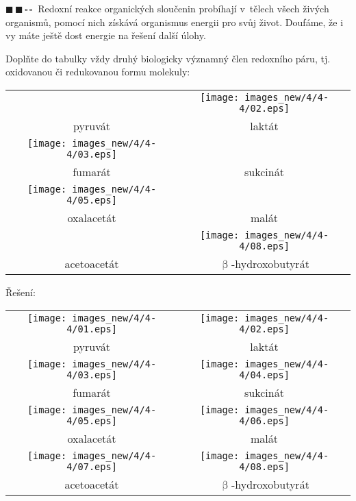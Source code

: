 \documentclass{book}
\newcommand{\dva}{$\blacksquare \, \blacksquare \, \square \, \square \; \; $}
\renewenvironment{quotation}{\par}{\par} %
\begin{document}
\hrulefill %
\begin{quotation}
\dva Redoxní reakce organických sloučenin probíhají v~tělech všech živých organismů, pomocí nich získává organismus energii pro svůj život. Doufáme, že i vy máte ještě dost energie na řešení další úlohy.

Doplňte do tabulky vždy druhý biologicky významný člen redoxního páru,
tj. oxidovanou či redukovanou formu molekuly:
\noindent \begin{center}
\begin{tabular}{c|c}

& \texttt{[image: images\_new/4/4-4/02.eps]}\tabularnewline
pyruvát & laktát\tabularnewline
\hline
\texttt{[image: images\_new/4/4-4/03.eps]} & \tabularnewline
fumarát & sukcinát\tabularnewline
\hline
\texttt{[image: images\_new/4/4-4/05.eps]} & \tabularnewline
oxalacetát & malát\tabularnewline
\hline
& \texttt{[image: images\_new/4/4-4/08.eps]}\tabularnewline
acetoacetát & $\upbeta$-hydroxobutyrát\tabularnewline

\end{tabular}
\end{center}
\end{quotation} \dotfill \par 

\newpage %
\-Řešení:
\noindent \begin{center}
\begin{tabular}{c|c}

\texttt{[image: images\_new/4/4-4/01.eps]} & \texttt{[image: images\_new/4/4-4/02.eps]}\tabularnewline
pyruvát & laktát\tabularnewline
\hline
\texttt{[image: images\_new/4/4-4/03.eps]} & \texttt{[image: images\_new/4/4-4/04.eps]}\tabularnewline
fumarát & sukcinát\tabularnewline
\hline
\texttt{[image: images\_new/4/4-4/05.eps]} & \texttt{[image: images\_new/4/4-4/06.eps]}\tabularnewline
oxalacetát & malát\tabularnewline
\hline
\texttt{[image: images\_new/4/4-4/07.eps]} & \texttt{[image: images\_new/4/4-4/08.eps]}\tabularnewline
acetoacetát & $\upbeta$-hydroxobutyrát\tabularnewline

\end{tabular}
\end{center}
\end{document}
